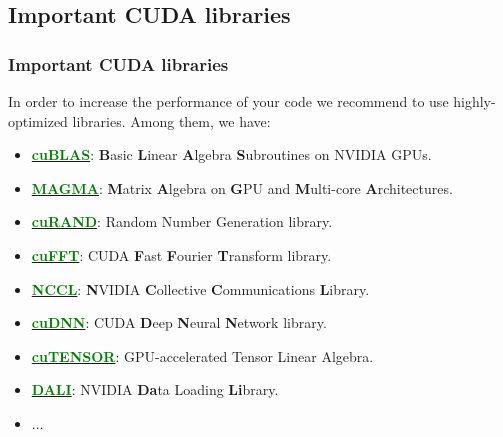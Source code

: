 \subsection{Important CUDA libraries}
\begin{frame}
   \frametitle{Important CUDA libraries}
     In order to increase the performance of your code we recommend 
     to use highly-optimized libraries. Among them, we have:
     \begin{itemize}
	\item \href{https://developer.nvidia.com/cublas}{\textbf{\textcolor{green}{cuBLAS}}}: 
		\textbf{B}asic \textbf{L}inear \textbf{A}lgebra \textbf{S}ubroutines on NVIDIA GPUs.
	\item \href{https://icl.utk.edu/magma/}{\textbf{\textcolor{green}{MAGMA}}}: 
		\textbf{M}atrix \textbf{A}lgebra on \textbf{G}PU and \textbf{M}ulti-core \textbf{A}rchitectures. 		
        \item \href{https://docs.nvidia.com/cuda/pdf/CURAND_Library.pdf}{\textbf{\textcolor{green}{cuRAND}}}: Random Number Generation library.
        \item \href{https://docs.nvidia.com/cuda/pdf/CUFFT_Library.pdf}{\textbf{\textcolor{green}{cuFFT}}}: 
		CUDA \textbf{F}ast \textbf{F}ourier \textbf{T}ransform library.
	\item \href{https://developer.nvidia.com/nccl}{\textbf{\textcolor{green}{NCCL}}}: 
	  \textbf{N}VIDIA \textbf{C}ollective \textbf{C}ommunications \textbf{L}ibrary. 		
	\item \href{https://developer.nvidia.com/cudnn}{\textbf{\textcolor{green}{cuDNN}}}: 
  	  CUDA \textbf{D}eep \textbf{N}eural \textbf{N}etwork library.		
	\item \href{https://developer.nvidia.com/cutensor}{\textbf{\textcolor{green}{cuTENSOR}}}: GPU-accelerated Tensor Linear Algebra.
	\item \href{https://developer.nvidia.com/DALI}{\textbf{\textcolor{green}{DALI}}}: NVIDIA \textbf{Da}ta Loading \textbf{Li}brary.
        \item $\ldots$
     \end{itemize}
\end{frame}


